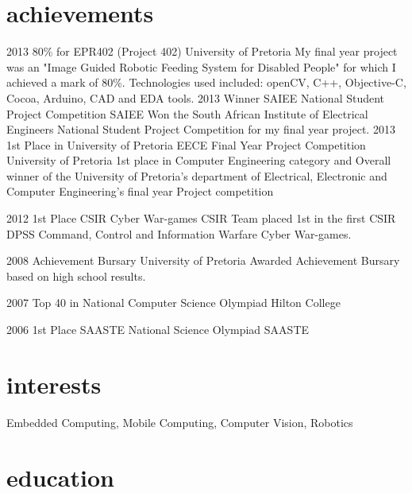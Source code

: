 \documentclass[a4paper]{friggeri-cv}
\begin{document}
\section{achievements}
\begin{entrylist}
	\entry
	{2013}
	{80\% for EPR402 (Project 402)}
	{University of Pretoria}
	{My final year project was an "Image Guided Robotic Feeding System for Disabled People" for which I achieved a mark of 80\%. Technologies used included: openCV, C++, Objective-C, Cocoa, Arduino, CAD and EDA tools.}
	\entry
	{2013}
	{Winner SAIEE National Student Project Competition}
	{SAIEE}
	{Won the South African Institute of Electrical Engineers National Student Project Competition for my final year project.}
	\entry
	{2013}
	{1st Place in University of Pretoria EECE Final Year Project Competition}
	{University of Pretoria}
	{1st place in Computer Engineering category and Overall winner of the University of Pretoria's department of Electrical, Electronic and Computer Engineering's final year Project competition}
	
	\entry
	{2012}
	{1st Place CSIR Cyber War-games}
	{CSIR}
	{Team placed 1st in the first CSIR DPSS Command, Control and Information Warfare Cyber War-games.}
	
	\entry
	{2008}
	{Achievement Bursary}
	{University of Pretoria}
	{Awarded Achievement Bursary based on high school results.}
	
\end{entrylist}
\begin{entrylist}
	
	\entry
	{2007}
	{Top 40 in National Computer Science Olympiad}
	{Hilton College}
	{}
	
	\entry
	{2006}
	{1st Place SAASTE National Science Olympiad}
	{SAASTE}
	{}

\end{entrylist}
\section{interests}
Embedded Computing, Mobile Computing, Computer Vision, Robotics 

\section{education}
\end{document}
